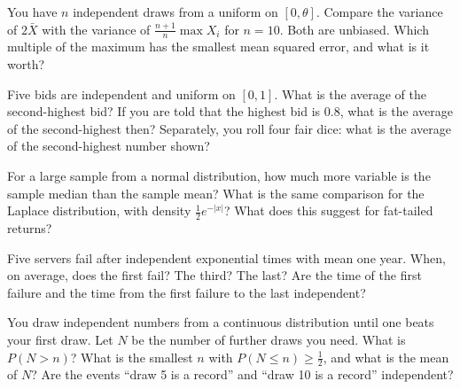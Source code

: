 \begin{question}\label{iq:iv1:order-statistics:5}
You have $n$ independent draws from a uniform on $[0, \theta]$. Compare the variance of $2\bar{X}$ with the variance of $\frac{n + 1}{n}\max X_i$ for $n = 10$. Both are unbiased. Which multiple of the maximum has the smallest mean squared error, and what is it worth?
\end{question}

\begin{question}\label{iq:iv1:order-statistics:6}
Five bids are independent and uniform on $[0, 1]$. What is the average of the second-highest bid? If you are told that the highest bid is $0.8$, what is the average of the second-highest then? Separately, you roll four fair dice: what is the average of the second-highest number shown?
\end{question}

\begin{question}\label{iq:iv1:order-statistics:7}
For a large sample from a normal distribution, how much more variable is the sample median than the sample mean? What is the same comparison for the Laplace distribution, with density $\frac12 e^{-|x|}$? What does this suggest for fat-tailed returns?
\end{question}

\begin{question}\label{iq:iv1:order-statistics:8}
Five servers fail after independent exponential times with mean one year. When, on average, does the first fail? The third? The last? Are the time of the first failure and the time from the first failure to the last independent?
\end{question}

\begin{question}\label{iq:iv1:order-statistics:9}
You draw independent numbers from a continuous distribution until one beats your first draw. Let $N$ be the number of further draws you need. What is $P(N > n)$? What is the smallest $n$ with $P(N \le n) \ge \frac12$, and what is the mean of $N$? Are the events ``draw 5 is a record'' and ``draw 10 is a record'' independent?
\end{question}

